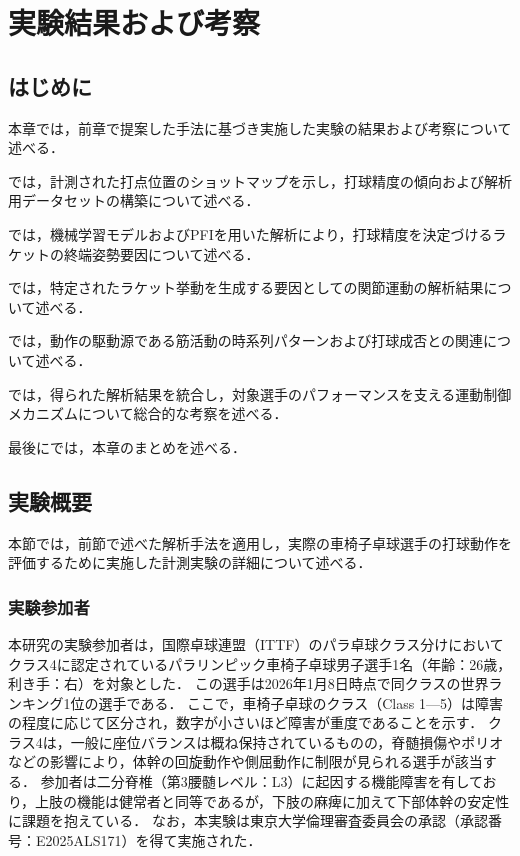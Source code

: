 \documentclass[../main]{subfiles}
\begin{document}
\chapter{実験結果および考察}
\label{cp:verification_experiment}
\thispagestyle{empty}
\minitoc
\newpage

\section{はじめに}
\label{sec:result_introduction}

本章では，前章で提案した手法に基づき実施した実験の結果および考察について述べる．

では，計測された打点位置のショットマップを示し，打球精度の傾向および解析用データセットの構築について述べる．

では，機械学習モデルおよびPFIを用いた解析により，打球精度を決定づけるラケットの終端姿勢要因について述べる．

では，特定されたラケット挙動を生成する要因としての関節運動の解析結果について述べる．

では，動作の駆動源である筋活動の時系列パターンおよび打球成否との関連について述べる．

では，得られた解析結果を統合し，対象選手のパフォーマンスを支える運動制御メカニズムについて総合的な考察を述べる．

最後にでは，本章のまとめを述べる．


\clearpage

\section{実験概要}
\label{sec:experiment}
本節では，前節で述べた解析手法を適用し，実際の車椅子卓球選手の打球動作を評価するために実施した計測実験の詳細について述べる．

\subsection{実験参加者}
\label{subsec:exp_person}
本研究の実験参加者は，国際卓球連盟（ITTF）のパラ卓球クラス分けにおいてクラス4に認定されているパラリンピック車椅子卓球男子選手1名（年齢：26歳，利き手：右）を対象とした．
この選手は2026年1月8日時点で同クラスの世界ランキング1位の選手である．
ここで，車椅子卓球のクラス（Class 1—5）は障害の程度に応じて区分され，数字が小さいほど障害が重度であることを示す．
クラス4は，一般に座位バランスは概ね保持されているものの，脊髄損傷やポリオなどの影響により，体幹の回旋動作や側屈動作に制限が見られる選手が該当する．
参加者は二分脊椎（第3腰髄レベル：L3）に起因する機能障害を有しており，上肢の機能は健常者と同等であるが，下肢の麻痺に加えて下部体幹の安定性に課題を抱えている．
なお，本実験は東京大学倫理審査委員会の承認（承認番号：E2025ALS171）を得て実施された．
\end{document}
